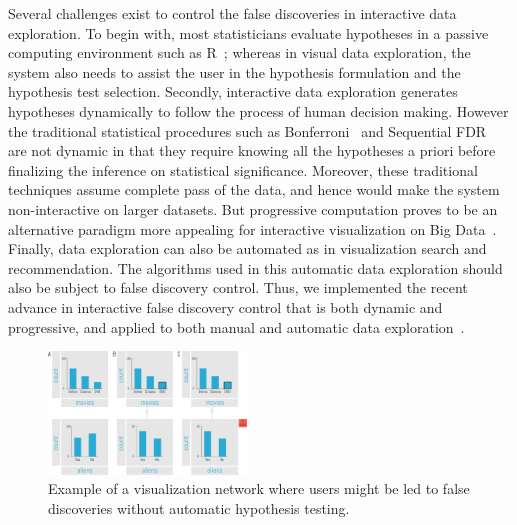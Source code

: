 Several challenges exist to control the false discoveries in interactive data exploration.  To begin with, most statisticians evaluate hypotheses in a passive computing environment such as R~\cite{R}; whereas in visual data exploration, the system also needs to assist the user in the hypothesis formulation and the hypothesis test selection. Secondly, interactive data exploration generates hypotheses dynamically to follow the process of human decision making.  However the traditional statistical procedures such as Bonferroni~\cite{bonferroni1936teoria} and Sequential FDR~\cite{g2016sequential} are not dynamic in that they require knowing all the hypotheses a priori before finalizing the inference on statistical significance.  Moreover, these traditional techniques assume complete pass of the data, and hence would make the system non-interactive on larger datasets.  But progressive computation proves to be an alternative paradigm more appealing for interactive visualization on Big Data~\cite{zgraggen2016progressive, onlineagg, vizdom}.  Finally, data exploration can also be automated as in visualization search and recommendation. The algorithms used in this automatic data exploration should also be subject to false discovery control.  Thus, we implemented the recent advance in interactive false discovery control that is both dynamic and progressive, and applied to both manual and automatic data exploration~\cite{zhao2016controlling}. 

\begin{figure}
\centering
\includegraphics[width=0.47\textwidth]{figures/example}
\caption{Example of a visualization network where users might be led to false discoveries without automatic hypothesis testing. }
\label{fig:example}	
\end{figure}